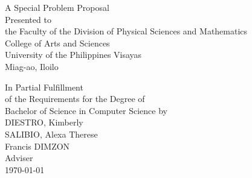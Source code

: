 \begin{titlepage}
\centering


\vspace{1.75cm}
A Special Problem Proposal\\
Presented to\\
the Faculty of the Division of Physical Sciences and Mathematics\\
College of Arts and Sciences\\
University of the Philippines Visayas\\
Miag-ao, Iloilo

\vspace{1.75cm}
In Partial Fulfillment\\
of the Requirements for the Degree of\\
Bachelor of Science in Computer Science
\vspace{1.75cm}
by\\

\vspace{1cm}
DIESTRO, Kimberly  \\
SALIBIO, Alexa Therese  \\

\vspace{1.75cm}
Francis DIMZON \\
Adviser\\

\vspace{1.75cm}
\today
\end{titlepage}
